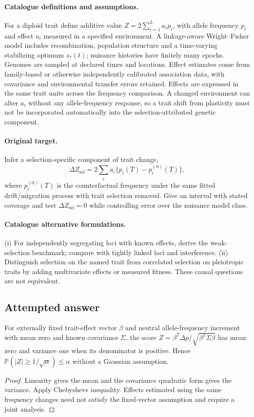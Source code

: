 \documentclass[11pt]{article}
\begin{document}
\paragraph{Catalogue definitions and assumptions.}
For a diploid trait define additive value $Z=2\sum_{i=1}^L a_i p_i$, with allele frequency $p_i$ and effect $a_i$ measured in a specified environment. A linkage-aware Wright--Fisher model includes recombination, population structure and a time-varying stabilizing optimum $z_*(t)$; nuisance histories have finitely many epochs. Genomes are sampled at declared times and locations. Effect estimates come from family-based or otherwise independently calibrated association data, with covariance and environmental transfer errors retained. Effects are expressed in the same trait units across the frequency comparison. A changed environment can alter $a_i$ without any allele-frequency response, so a trait shift from plasticity must not be incorporated automatically into the selection-attributed genetic component.
\paragraph{Original target.}
Infer a selection-specific component of trait change,
\[
 \Delta Z_{\mathrm{sel}}=
 2\sum_i a_i\{p_i(T)-p_i^{(0)}(T)\},
\]
where $p_i^{(0)}(T)$ is the counterfactual frequency under the same fitted drift/migration process with trait selection removed. Give an interval with stated coverage and test $\Delta Z_{\mathrm{sel}}=0$ while controlling error over the nuisance model class.
\paragraph{Catalogue alternative formulations.}
(i) For independently segregating loci with known effects, derive the weak-selection benchmark; compare with tightly linked loci and interference. (ii) Distinguish selection on the named trait from correlated selection on pleiotropic traits by adding multivariate effects or measured fitness. These causal questions are not equivalent.
\subsection{Attempted answer}
\begin{proposition}
For externally fixed trait-effect vector $\beta$ and neutral allele-frequency increment with mean zero and known covariance $\Sigma$, the score $Z=\beta^T\Delta p/\sqrt{\beta^T\Sigma\beta}$ has mean zero and variance one when its denominator is positive. Hence $\mathbb{P}(|Z|\geq1/\sqrt\alpha)\leq\alpha$ without a Gaussian assumption.
\end{proposition}
\begin{proof}
Linearity gives the mean and the covariance quadratic form gives the variance. Apply Chebyshev\textquotesingle s inequality. Effects estimated using the same frequency changes need not satisfy the fixed-vector assumption and require a joint analysis.
\end{proof}
\end{document}
